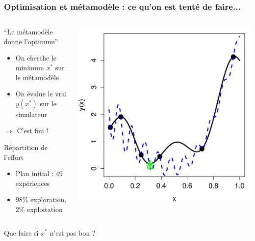 \documentclass{beamer}
\begin{document}
\begin{frame}
\frametitle{Optimisation et métamodèle : ce qu'on est tenté de faire...}
\begin{columns}[c]
 \begin{column}{.51\textwidth}
  
\begin{block}{``Le métamodèle donne l'optimum''}
 \begin{itemize}
  \item On cherche le minimum $x^*$ sur le métamodèle
  \item On évalue le vrai $y(x^*)$ sur le simulateur
 \end{itemize}
$\Rightarrow$ C'est fini !
\end{block}

\begin{block}{Répartition de l'effort}
 \begin{itemize}
  \item Plan initial : 49 expériences
  \item 98\% exploration, 2\% exploitation
 \end{itemize}
\end{block}
 \end{column}
 \begin{column}{.49\textwidth}
  \includegraphics[width=\textwidth]{fig/exoptim1.pdf}
 \end{column}
\end{columns}
\vspace{1mm}
\centering
\alert{Que faire si $x^*$ n'est pas bon ?}
\end{frame}
\end{document}
